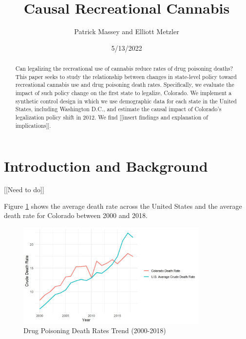 \documentclass{article}
\author{Patrick Massey and Elliott Metzler}
\title{Causal Recreational Cannabis}
\date{5/13/2022}
\begin{document}
\maketitle

\begin{abstract}

Can legalizing the recreational use of cannabis reduce rates of drug poisoning deaths? This paper seeks to study the relationship between changes in state-level policy toward recreational cannabis use and drug poisoning death rates. Specifically, we evaluate the impact of such policy change on the first state to legalize, Colorado. We implement a synthetic control design in which we use demographic data for each state in the United States, including Washington D.C., and estimate the causal impact of Colorado's legalization policy shift in 2012. We find [[insert findings and explanation of implications]].

\end{abstract}

\newpage

\section{Introduction and Background}

[[Need to do]]



Figure \ref{fig:death_rates_trend} shows the average death rate across the United States and the average death rate for Colorado between 2000 and 2018.

\begin{figure}[H]
	\begin{center}
		\includegraphics[width=0.85\textwidth]{death_rates_trend}
	\end{center}
	\caption{Drug Poisoning Death Rates Trend (2000-2018)}
	\label{fig:death_rates_trend}
\end{figure}
\end{document}
